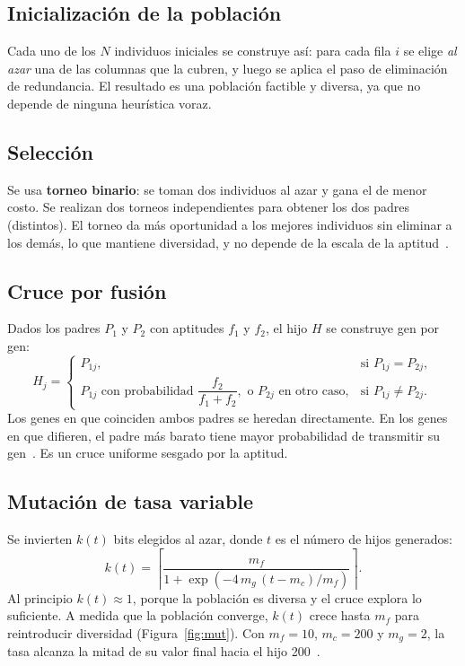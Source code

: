 \documentclass[11pt,a4paper]{article}
\begin{document}
\subsection{Inicialización de la población}
Cada uno de los $N$ individuos iniciales se construye así: para cada fila $i$ se elige \emph{al azar} una
de las columnas que la cubren, y luego se aplica el paso de eliminación de redundancia. El
resultado es una población factible y diversa, ya que no depende de ninguna heurística voraz.

\subsection{Selección}
Se usa \textbf{torneo binario}: se toman dos individuos al azar y gana el de menor costo. Se
realizan dos torneos independientes para obtener los dos padres (distintos). El torneo da más
oportunidad a los mejores individuos sin eliminar a los demás, lo que mantiene diversidad, y no
depende de la escala de la aptitud~\citep{goldberg1989}.

\subsection{Cruce por fusión}
Dados los padres $P_1$ y $P_2$ con aptitudes $f_1$ y $f_2$, el hijo $H$ se construye gen por gen:
\[
H_j=\begin{cases}
P_{1j}, & \text{si } P_{1j}=P_{2j},\\
P_{1j} \text{ con probabilidad } \dfrac{f_2}{f_1+f_2}, \text{ o } P_{2j} \text{ en otro caso}, & \text{si } P_{1j}\neq P_{2j}.
\end{cases}
\]
Los genes en que coinciden ambos padres se heredan directamente. En los genes en que difieren, el
padre más barato tiene mayor probabilidad de transmitir su gen~\citep{beasley1996ga}. Es un cruce
uniforme sesgado por la aptitud.

\subsection{Mutación de tasa variable}
Se invierten $k(t)$ bits elegidos al azar, donde $t$ es el número de hijos generados:
\[
k(t)=\left\lceil \frac{m_f}{1+\exp\!\left(-4\,m_g\,(t-m_c)/m_f\right)} \right\rceil .
\]
Al principio $k(t)\approx 1$, porque la población es diversa y el cruce explora lo suficiente. A
medida que la población converge, $k(t)$ crece hasta $m_f$ para reintroducir diversidad
(Figura~\ref{fig:mut}). Con $m_f=10$, $m_c=200$ y $m_g=2$, la tasa alcanza la mitad de su valor
final hacia el hijo 200~\citep{beasley1996ga}.
\end{document}
